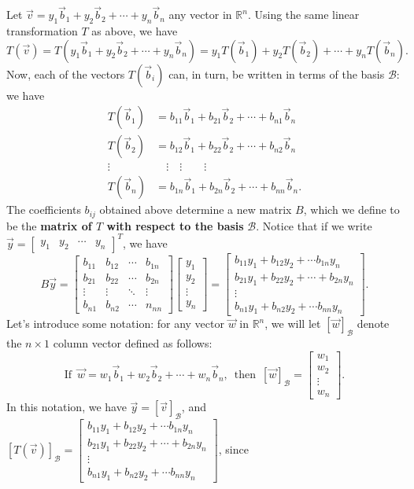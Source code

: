 \documentclass[12pt,letterpaper]{article}
\newcommand{\R}{\mathbb{R}}
\newcommand{\y}{\mathbf{y}}
\newcommand{\bbm}{\begin{bmatrix}}
\newcommand{\ebm}{\end{bmatrix}}
\begin{document}
Let $\vec{v} = y_1\vec{b}_1+y_2\vec{b}_2+\cdots +y_n\vec{b}_n$ any vector in $\R^n$. Using the same linear transformation $T$ as above, we have
\[
 T(\vec{v}) = T(y_1\vec{b}_1+y_2\vec{b}_2+\cdots +y_n\vec{b}_n) = y_1T(\vec{b}_1)+y_2T(\vec{b}_2)+\cdots + y_nT(\vec{b}_n).
\]
Now, each of the vectors $T(\vec{b}_i)$ can, in turn, be written in terms of the basis $\mathcal{B}$: we have
\begin{align*}
 T(\vec{b}_1) &= b_{11}\vec{b}_1 + b_{21}\vec{b}_2 + \cdots + b_{n1}\vec{b}_n\\
 T(\vec{b}_2) &= b_{12}\vec{b}_1 + b_{22}\vec{b}_2 + \cdots + b_{n2}\vec{b}_n\\
  \vdots \quad & \quad \vdots \quad \vdots \quad \quad \vdots\\
 T(\vec{b}_n) &= b_{1n}\vec{b}_1 + b_{2n}\vec{b}_2 + \cdots + b_{nn}\vec{b}_n.
\end{align*}
The coefficients $b_{ij}$ obtained above determine a new matrix $B$, which we define to be the \textbf{matrix of $T$ with respect to the basis} $\mathcal{B}$. Notice that if we write $\vec{y} = \bbm y_1 & y_2 & \cdots & y_n\ebm^T$, we have
\[
 B\vec{y} = \bbm b_{11} & b_{12} & \cdots & b_{1n}\\b_{21} & b_{22} & \cdots & b_{2n}\\\vdots & \vdots & \ddots & \vdots\\b_{n1}&b_{n2}&\cdots &n_{nn}\ebm
\bbm y_1\\y_2\\\vdots \\y_n\ebm = \bbm b_{11}y_1+b_{12}y_2+\cdots b_{1n}y_n\\b_{21}y_1+b_{22}y_2 + \cdots + b_{2n}y_n\\ \vdots \\b_{n1}y_1+b_{n2}y_2+\cdots b_{nn}y_n\ebm.
\]
Let's introduce some notation: for any vector $\vec{w}$ in $\R^n$, we will let $[\vec{w}]_{\mathcal{B}}$ denote the $n\times 1$ column vector defined as follows: 
\[
 \text{If } \, \vec{w} = w_1\vec{b}_1 + w_2\vec{b}_2 + \cdots + w_n\vec{b}_n, \, \text{ then } \, [\vec{w}]_{\mathcal{B}} = \bbm w_1\\w_2\\\vdots \\w_n\ebm.
\]
In this notation, we have $\vec{y}=[\vec{v}]_{\mathcal{B}}$, and $[T(\vec{v})]_{\mathcal{B}} = \bbm b_{11}y_1+b_{12}y_2+\cdots b_{1n}y_n\\b_{21}y_1+b_{22}y_2 + \cdots + b_{2n}y_n\\ \vdots \\b_{n1}y_1+b_{n2}y_2+\cdots b_{nn}y_n\ebm$, since
\end{document}
